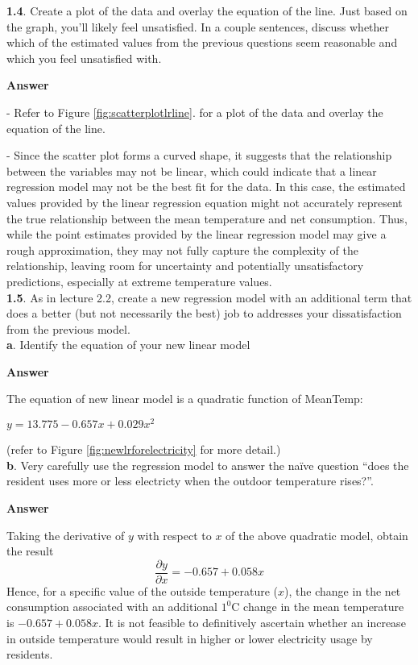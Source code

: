 \documentclass[12pt,doublespace]{article}
\begin{document}
	\textbf{1.4}. Create a plot of the data and overlay the equation of the line. Just based on the graph, you’ll likely feel unsatisfied. In a couple sentences, discuss whether which of the estimated values from the previous questions seem reasonable and which you feel unsatisfied with.	
	
	\textbf{Answer} 
	
	- Refer to Figure \ref{fig:scatterplotlrline}. for a plot of the data and overlay the equation of the line.
	
	- Since the scatter plot forms a curved shape, it suggests that the relationship between the variables may not be linear, which could indicate that a linear regression model may not be the best fit for the data. In this case, the estimated values provided by the linear regression equation might not accurately represent the true relationship between the mean temperature and net consumption. Thus, while the point estimates provided by the linear regression model may give a rough approximation, they may not fully capture the complexity of the relationship, leaving room for uncertainty and potentially unsatisfactory predictions, especially at extreme temperature values.\\
	
	\textbf{1.5}. As in lecture 2.2, create a new regression model with an additional term that does a better (but not necessarily the best) job to addresses your dissatisfaction from the previous model.\\
	
	\textbf{a}. Identify the equation of your new linear model
	
	\textbf{Answer}
	
	The equation of new linear model is a quadratic function of MeanTemp:
\begin{center}
		$y = 13.775 -0.657x +0.029x^{2} $
\end{center}
	
	 (refer to Figure \ref{fig:newlrforelectricity} for more detail.)\\
	
	\textbf{b}. Very carefully use the regression model to answer the naïve question “does the resident uses more or less electricty when the outdoor temperature rises?”. 
	
	\textbf{Answer}
	
	Taking the derivative of $y$ with respect to $x$ of the above quadratic model, obtain the result
	 $$\frac{\partial y}{\partial x} = -0.657 + 0.058x$$
	 Hence, for a specific value of the outside temperature ($x$), the change in the net consumption associated with an additional $1^{0}$C change in the mean temperature is $-0.657 + 0.058x$. It is not feasible to definitively ascertain whether an increase in outside temperature would result in higher or lower electricity usage by residents.\\   
\end{document}
